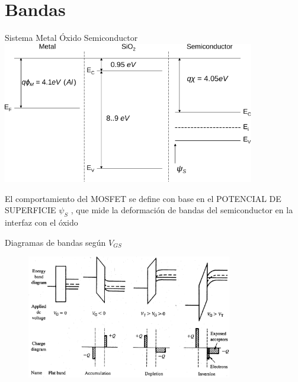 \documentclass[t,aspectratio=169,10pt]{beamer}
\begin{document}
\section{Bandas}
\begin{frame}{Sistema Metal Óxido Semiconductor}
\centering
\includegraphics[width=11cm]{sistemaMOS}

El comportamiento del MOSFET se define con base en el POTENCIAL DE SUPERFICIE $\psi_S$ , que mide la deformación de bandas del semiconductor en la interfaz con el óxido
\end{frame}


\begin{frame}{Diagramas de bandas según $V_{GS}$}

\begin{figure}[H]
    \centering
    \includegraphics[width=0.8\textwidth]{figuras/bandas_mosfet.png}
\end{figure}
    
\end{frame}
\end{document}
